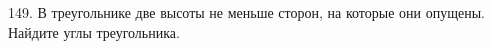 149. В треугольнике две высоты не меньше сторон, на которые они опущены. Найдите углы треугольника.\\
